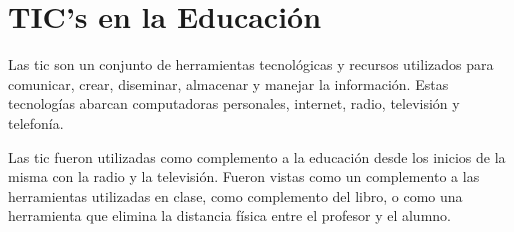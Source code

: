 \chapter{TIC's en la Educación}
\label{chap:tics}


Las \Gls{tic} son un conjunto de herramientas tecnológicas y recursos utilizados
para comunicar, crear, diseminar, almacenar y manejar la
información\cite{unesco:ict}. Estas tecnologías abarcan computadoras personales,
internet, radio, televisión y telefonía\cite{tinio:ict}.

Las \Gls{tic} fueron utilizadas como complemento a la educación desde los
inicios de la misma con la radio y la televisión. Fueron vistas como un
complemento a las herramientas utilizadas en clase, como complemento del libro,
o como una herramienta que elimina la distancia física entre el profesor y el
alumno\cite{unesco:ict}. 












